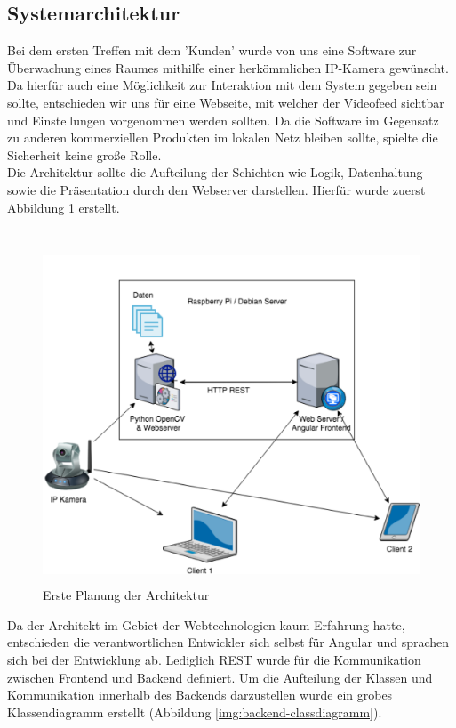 \subsection{Systemarchitektur}
Bei dem ersten Treffen mit dem 'Kunden' wurde von uns eine Software zur Überwachung eines Raumes mithilfe einer herkömmlichen IP-Kamera gewünscht.
Da hierfür auch eine Möglichkeit zur Interaktion mit dem System gegeben sein sollte, entschieden wir uns für eine Webseite, mit welcher
der Videofeed sichtbar und Einstellungen vorgenommen werden sollten. Da die Software im Gegensatz zu anderen kommerziellen Produkten im lokalen Netz bleiben sollte,
spielte die Sicherheit keine große Rolle.\\
Die Architektur sollte die Aufteilung der Schichten wie Logik, Datenhaltung sowie die Präsentation durch den Webserver darstellen.
Hierfür wurde zuerst Abbildung \ref{img:architecture-sketch} erstellt.\\\\
\begin{figure}[h]
	\centering
	\includegraphics[height=10cm]{content/pictures/architecture-sketch.png}
	\caption{Erste Planung der Architektur}
	\label{img:architecture-sketch}
\end{figure}
Da der Architekt im Gebiet der Webtechnologien kaum Erfahrung hatte, entschieden die verantwortlichen Entwickler sich selbst für Angular und sprachen sich bei
der Entwicklung ab. Lediglich REST wurde für die Kommunikation zwischen Frontend und Backend definiert. 
Um die Aufteilung der Klassen und Kommunikation innerhalb des Backends darzustellen wurde ein grobes Klassendiagramm erstellt (Abbildung \ref{img:backend-classdiagramm}).\\\\
